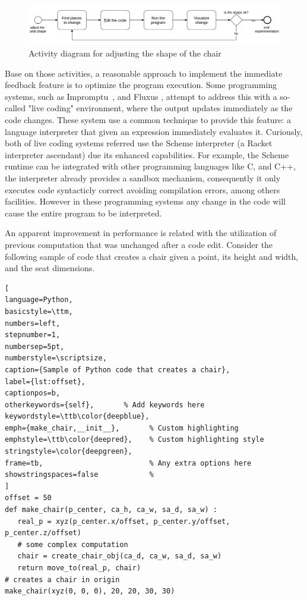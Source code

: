 \begin{figure}[!htbp]
  \centering
  \includegraphics[width=1\textwidth]{images/run-activity}
    \caption{Activity diagram for adjusting the shape of the chair}
  \label{fig:run-activity}
\end{figure}

Base on those activities, a reasonable approach to implement the immediate feedback feature is to optimize the program execution. Some programming systems, such as Impromptu~\citep{sorensen2005impromptu}, and Fluxus \citep{griffiths2007fluxus}, attempt to address this with a so-called "live coding" environment, where the output updates immediately as the code changes. These system use a common technique to provide this feature: a language interpreter that given an expression immediately evaluates it. Curiously, both of live coding systems referred use the Scheme interpreter (a Racket~\citep{findler2002drscheme} interpreter ascendant) due its enhanced capabilities. For example, the Scheme runtime can be integrated with other programming languages like C, and C++, the interpreter already provides a sandbox mechanism, consequently it only executes code syntacticly correct avoiding compilation errors, among others facilities. However in these programming systems any change in the code will cause the entire program to be interpreted.

An apparent improvement in performance is related with the utilization of previous computation that was unchanged after a code edit. Consider the following sample of code that creates a chair given a point, its height and width, and the seat dimensions. \\ 

\begin{lstlisting}[
language=Python,
basicstyle=\ttm,
numbers=left,
stepnumber=1,
numbersep=5pt,                   
numberstyle=\scriptsize, 
caption={Sample of Python code that creates a chair},
label={lst:offset},
captionpos=b, 
otherkeywords={self},       % Add keywords here
keywordstyle=\ttb\color{deepblue},
emph={make_chair,__init__},       % Custom highlighting
emphstyle=\ttb\color{deepred},    % Custom highlighting style
stringstyle=\color{deepgreen},
frame=tb,                         % Any extra options here
showstringspaces=false            % 
]
offset = 50
def make_chair(p_center, ca_h, ca_w, sa_d, sa_w) :
   real_p = xyz(p_center.x/offset, p_center.y/offset, p_center.z/offset)
   # some complex computation
   chair = create_chair_obj(ca_d, ca_w, sa_d, sa_w)
   return move_to(real_p, chair)
# creates a chair in origin
make_chair(xyz(0, 0, 0), 20, 20, 30, 30)
\end{lstlisting}

